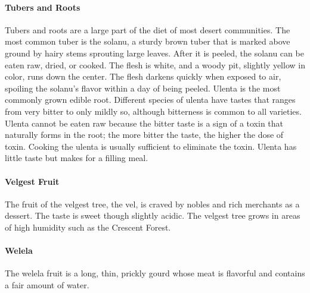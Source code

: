 \begin{multicols}{2}
\paragraph{Tubers and Roots} Tubers and roots are a large part of the diet of most desert communities. The most common tuber is the solanu, a sturdy brown tuber that is marked above ground by hairy stems sprouting large leaves. After it is peeled, the solanu can be eaten raw, dried, or cooked. The flesh is white, and a woody pit, slightly yellow in color, runs down the center. The flesh darkens quickly when exposed to air, spoiling the solanu's flavor within a day of being peeled. Ulenta is the most commonly grown edible root. Different species of ulenta have tastes that ranges from very bitter to only mildly so, although bitterness is common to all varieties. Ulenta cannot be eaten raw because the bitter taste is a sign of a toxin that naturally forms in the root; the more bitter the taste, the higher the dose of toxin. Cooking the ulenta is usually sufficient to eliminate the toxin. Ulenta has little taste but makes for a filling meal.\\
\paragraph{Velgest Fruit} The fruit of the velgest tree, the vel, is craved by nobles and rich merchants as a dessert. The taste is sweet though slightly acidic. The velgest tree grows in areas of high humidity such as the Crescent Forest.\\
\paragraph{Welela} The welela fruit is a long, thin, prickly gourd whose meat is flavorful and contains a fair amount of water.\\

\end{multicols}
\hrulefill

